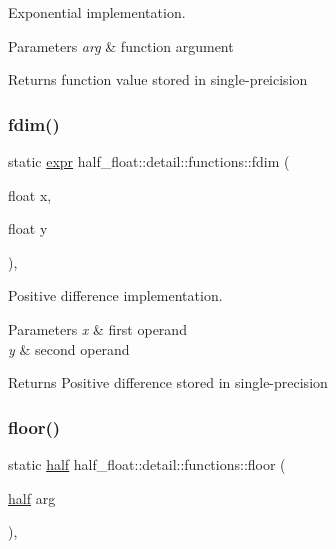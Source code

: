 Exponential implementation. 
\begin{DoxyParams}{Parameters}
{\em arg} & function argument \\
\hline
\end{DoxyParams}
\begin{DoxyReturn}{Returns}
function value stored in single-\/preicision 
\end{DoxyReturn}
\mbox{\label{structhalf__float_1_1detail_1_1functions_a9850489a627096344f41d3e18976eaff}} 
\subsubsection{\texorpdfstring{fdim()}{fdim()}}
{\footnotesize\ttfamily static \hyperlink{structhalf__float_1_1detail_1_1expr}{expr} half\+\_\+float\+::detail\+::functions\+::fdim (\begin{DoxyParamCaption}\item[{float}]{x,  }\item[{float}]{y }\end{DoxyParamCaption})\hspace{0.3cm}{\ttfamily [inline]}, {\ttfamily [static]}}

Positive difference implementation. 
\begin{DoxyParams}{Parameters}
{\em x} & first operand \\
\hline
{\em y} & second operand \\
\hline
\end{DoxyParams}
\begin{DoxyReturn}{Returns}
Positive difference stored in single-\/precision 
\end{DoxyReturn}
\mbox{\label{structhalf__float_1_1detail_1_1functions_ac468426b43557f8afbdcb60b94b5a8a1}} 
\subsubsection{\texorpdfstring{floor()}{floor()}}
{\footnotesize\ttfamily static \hyperlink{classhalf__float_1_1half}{half} half\+\_\+float\+::detail\+::functions\+::floor (\begin{DoxyParamCaption}\item[{\hyperlink{classhalf__float_1_1half}{half}}]{arg }\end{DoxyParamCaption})\hspace{0.3cm}{\ttfamily [inline]}, {\ttfamily [static]}}

